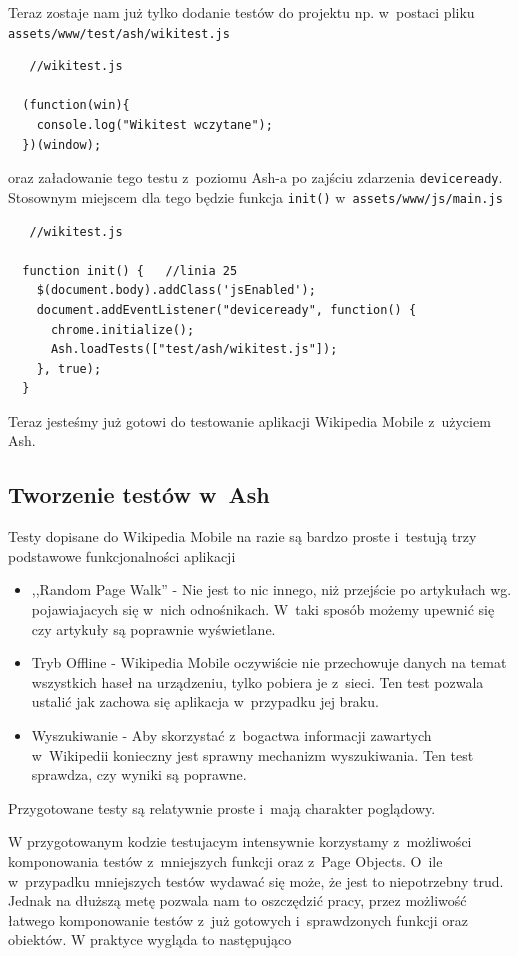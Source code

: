 \documentclass[brudnopis]{xmgr}
\begin{document}
Teraz zostaje nam już tylko dodanie testów do projektu np. w~postaci pliku  \texttt{assets/www/test/ash/wikitest.js} 

\begin{lstlisting}
   //wikitest.js

  (function(win){  
    console.log("Wikitest wczytane");
  })(window);
\end{lstlisting}

oraz załadowanie tego testu z~poziomu Ash-a po zajściu zdarzenia \texttt{deviceready}. Stosownym miejscem dla tego będzie funkcja \texttt{init()} w~\texttt{assets/www/js/main.js}

\begin{lstlisting}
   //wikitest.js

  function init() {   //linia 25
    $(document.body).addClass('jsEnabled');
    document.addEventListener("deviceready", function() {
      chrome.initialize(); 
      Ash.loadTests(["test/ash/wikitest.js"]);
    }, true);
  }
\end{lstlisting}

Teraz jesteśmy już gotowi do testowanie aplikacji Wikipedia Mobile z~użyciem Ash.

\subsection{Tworzenie testów w~Ash}

Testy dopisane do Wikipedia Mobile na razie są bardzo proste i~testują trzy podstawowe funkcjonalności aplikacji 

\begin{itemize}
  \item ,,Random Page Walk'' - Nie jest to nic innego, niż przejście po artykułach wg. pojawiajacych się w~nich odnośnikach. W~taki sposób możemy upewnić się czy artykuły są poprawnie wyświetlane.
  \item Tryb Offline - Wikipedia Mobile oczywiście nie przechowuje danych na temat wszystkich haseł na urządzeniu, tylko pobiera je z~sieci. Ten test pozwala ustalić jak zachowa się aplikacja w~przypadku jej braku.
  \item Wyszukiwanie - Aby skorzystać z~bogactwa informacji zawartych w~Wikipedii konieczny jest sprawny mechanizm wyszukiwania. Ten test sprawdza, czy wyniki są poprawne.  
\end{itemize}

Przygotowane testy są relatywnie proste i~mają charakter poglądowy. 

W przygotowanym kodzie testujacym intensywnie korzystamy z~możliwości komponowania testów z~mniejszych funkcji oraz z~Page Objects. O~ile w~przypadku mniejszych testów wydawać się może, że jest to niepotrzebny trud. Jednak na dłuższą metę pozwala nam to oszczędzić pracy, przez możliwość łatwego komponowanie testów z~już gotowych i~sprawdzonych funkcji oraz obiektów. W praktyce wygląda to następująco
\end{document}
